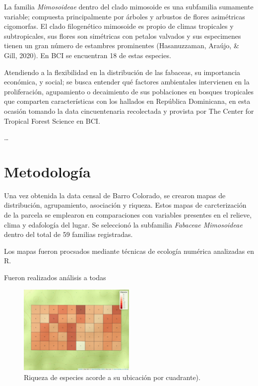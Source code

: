 \documentclass[11pt,]{article}
\begin{document}
La familia \emph{Mimosoideae} dentro del clado mimosoide es una
subfamilia sumamente variable; compuesta principalmente por árboles y
arbustos de flores asimétricas cigomorfas. El clado filogenético
mimosoide es propio de climas tropicales y subtropicales, sus flores son
simétricas con petalos valvados y sus especimenes tienen un gran número
de estambres prominentes (Hasanuzzaman, Araújo, \& Gill, 2020). En BCI
se encuentran 18 de estas especies.

Atendiendo a la flexibilidad en la distribución de las fabaceas, su
importancia económica, y social; se busca entender qué factores
ambientales intervienen en la proliferación, agupamiento o decaimiento
de sus poblaciones en bosques tropicales que comparten características
con los hallados en República Dominicana, en esta ocasión tomando la
data cincuentenaria recolectada y provista por The Center for Tropical
Forest Science en BCI.

\ldots

\section{Metodología}\label{metodologuxeda}

Una vez obtenida la data censal de Barro Colorado, se crearon mapas de
distribución, agrupamiento, asociación y riqueza. Estos mapas de
carcterización de la parcela se emplearon en comparaciones con variables
presentes en el relieve, clima y edafología del lugar. Se seleccionó la
subfamilia \emph{Fabaceae Mimosoideae} dentro del total de 59 familias
registradas.

Los mapas fueron procsados mediante técnicas de ecología numérica
analizadas en R.

Fueron realizados análisis a todas

\begin{figure}
\centering
\includegraphics[width=0.50000\textwidth]{mapa_cuadros_riq_mi_familia.png}
\caption{Riqueza de especies acorde a su ubicación por cuadrante).}
\end{figure}
\end{document}
